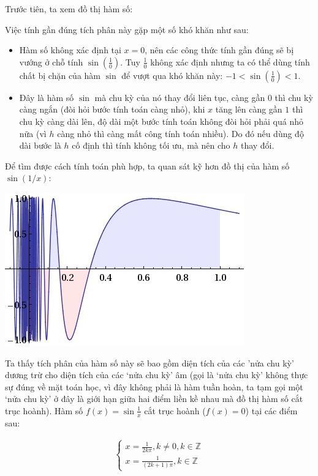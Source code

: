 \documentclass[12pt]{article}
\begin{document}
Trước tiên, ta xem đồ thị hàm số:


Việc tính gần đúng tích phân này gặp một số khó khăn như sau:
\begin{itemize}
 \item Hàm số không xác định tại $x=0$, nên các công thức tính gần đúng sẽ bị vướng ở chỗ tính $\sin(\frac{1}{0})$. Tuy $\frac{1}{0}$ không xác định nhưng ta có thể dùng tính chất bị chặn của hàm $\sin$ để vượt qua khó khăn này: $-1 < \sin(\frac{1}{0}) < 1$.
 \item Đây là hàm số $\sin$ mà chu kỳ của nó thay đổi liên tục, càng gần $0$ thì chu kỳ càng ngắn (đòi hỏi bước tính toán càng nhỏ), khi $x$ tăng lên càng gần $1$ thì chu kỳ càng dài lên, độ dài một bước tính toán không đòi hỏi phải quá nhỏ nữa (vì $h$ càng nhỏ thì càng mất công tính toán nhiều). Do đó nếu dùng độ dài bước là $h$ cố định thì tính không tối ưu, mà nên cho $h$ thay đổi.
\end{itemize}

Để tìm được cách tính toán phù hợp, ta quan sát kỹ hơn đồ thị của hàm số $\sin(1/x)$:

\begin{center}
 \includegraphics{./integral_sin.jpg}
\end{center}

Ta thấy tích phân của hàm số này sẽ bao gồm diện tích của các 'nửa chu kỳ' dương trừ cho diện tích của các `nửa chu kỳ' âm (gọi là `nửa chu kỳ' không thực sự đúng về mặt toán học, vì đây không phải là hàm tuần hoàn, ta tạm gọi một `nửa chu kỳ' ở đây là giới hạn giữa hai điểm liền kề nhau mà đồ thị hàm số cắt trục hoành). Hàm số $f(x)=\sin \frac{1}{x}$ cắt trục hoành ($f(x)=0$) tại các điểm sau:

\begin{align*}
 \left\lbrace \begin{array}{l}
               x=\frac{1}{2k \pi}, k \neq 0, k \in \mathbb{Z} \\
               x=\frac{1}{(2k+1) \pi}, k \in \mathbb{Z}
              \end{array}
              \right.
\end{align*}
\end{document}
